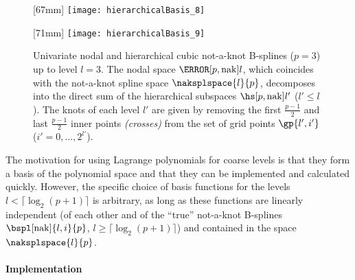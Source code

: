 \begin{figure}
  [67mm]{%
    \texttt{[image: hierarchicalBasis\_8]}%
  }%
  \hfill%
  \hfill%
  [71mm]{%
    \texttt{[image: hierarchicalBasis\_9]}%
  }%
  \caption[%
    Nodal and hierarchical not-a-knot B-splines%
  ]{%
    Univariate nodal and hierarchical cubic not-a-knot B-splines ($p = 3$)
    up to level $l = 3$.
    The nodal space $\nsbspl[\nak]{l}{p}$,
    which coincides with the not-a-knot spline space $\naksplspace{l}{p}$,
    decomposes into the direct sum
    of the hierarchical subspaces $\hsbspl[\nak]{l'}{p}$ ($l' \le l$).
    The knots of each level $l'$ are given by removing the
    first $\tfrac{p-1}{2}$ and last $\tfrac{p-1}{2}$
    inner points \emph{(crosses)}
    from the set of grid points $\gp{l',i'}$
    ($i' = 0, \dotsc, 2^{l'}$).%
  }%
  \label{fig:notAKnotBSpline}%
\end{figure}

The motivation for using Lagrange polynomials for coarse levels
is that they form a basis of the polynomial space
and that they can be implemented and calculated quickly.
However, the specific choice of basis functions for the levels
$l < \lceil\log_2(p + 1)\rceil$ is arbitrary,
as long as these functions are linearly independent
(of each other and of the ``true'' not-a-knot B-splines
$\bspl[\nak]{l,i}{p}$, $l \ge \lceil\log_2(p+1)\rceil$)
and contained in the space $\naksplspace{l}{p}$.

\paragraph{Implementation}

